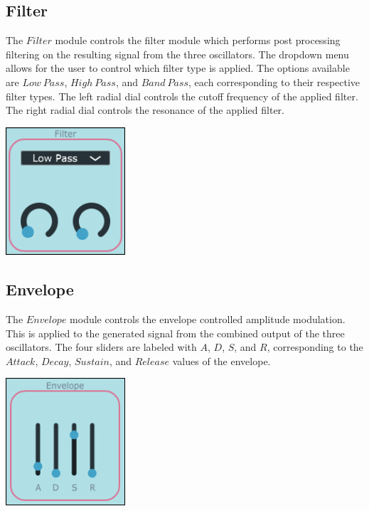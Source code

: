 \documentclass[a4paper,12pt]{report}
\begin{document}
\subsection{Filter}
\label{subsec:filter}
The $Filter$ module controls the filter module which performs post processing filtering on the resulting signal from the three oscillators. The dropdown menu allows for the user to control which filter type is applied. The options available are $Low\ Pass$, $High\ Pass$, and $Band\ Pass$, each corresponding to their respective filter types. The left radial dial controls the cutoff frequency of the applied filter. The right radial dial controls the resonance of the applied filter.

\begin{center}
\includegraphics[width=12em]{FilterScreenshot.png}
\end{center}

\subsection{Envelope}
\label{subsec:env}
The $Envelope$ module controls the envelope controlled amplitude modulation. This is applied to the generated signal from the combined output of the three oscillators. The four sliders are labeled with $A$, $D$, $S$, and $R$, corresponding to the $Attack$, $Decay$, $Sustain$, and $Release$ values of the envelope.

\begin{center}
\includegraphics[width=12em]{EnvelopeScreenshot.png}
\end{center}
\end{document}
